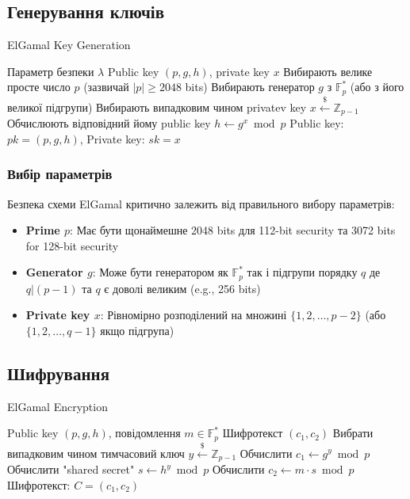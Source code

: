 \subsection{Генерування ключів}

\begin{algorithm}
    \caption{ElGamal Key Generation}
    \begin{algorithmic}[1]
        \Require Параметр безпеки $\lambda$
        \Ensure Public key $(p, g, h)$, private key $x$
        \State Вибирають велике просте число $p$ (зазвичай $|p| \geq 2048$ bits)
        \State Вибирають генератор $g$ з $\mathbb{F}_p^*$ (або з його великої підгрупи)
        \State Вибирають випадковим чином privatev key $x \xleftarrow{\$} \mathbb{Z}_{p-1}$
        \State Обчислюють відповідний йому public key $h \gets g^x \bmod p$
        \State \Return Public key: $pk = (p, g, h)$, Private key: $sk = x$
    \end{algorithmic}
\end{algorithm}

\subsubsection{Вибір параметрів}

Безпека схеми ElGamal критично залежить від правильного вибору параметрів:

\begin{itemize}
    \item \textbf{Prime $p$}: Має бути щонаймешне 2048 bits для 112-bit security та 3072 bits for 128-bit security~\cite{barker2020recommendation}
    \item \textbf{Generator $g$}: Може бути генератором як $\mathbb{F}_p^*$ так і підгрупи порядку $q$ де 
        $q \vert (p-1)$ та $q$ є доволі великим (e.g., 256 bits)
    \item \textbf{Private key $x$}: Рівномірно розподілений на множині $\{1, 2, \ldots, p-2\}$ 
        (або $\{1, 2, \ldots, q-1\}$ якщо підгрупа)
\end{itemize}

\subsection{Шифрування}

\begin{algorithm}
    \caption{ElGamal Encryption}
    \begin{algorithmic}[1]
        \Require Public key $(p, g, h)$, повідомлення $m \in \mathbb{F}_p^*$
        \Ensure Шифротекст $(c_1, c_2)$
        \State Вибрати випадковим чином тимчасовий ключ $y \xleftarrow{\$} \mathbb{Z}_{p-1}$
        \State Обчислити $c_1 \gets g^y \bmod p$
        \State Обчислити "shared secret"{} $s \gets h^y \bmod p$
        \State Обчислити $c_2 \gets m \cdot s \bmod p$
        \State \Return Шифротекст: $C = (c_1, c_2)$
    \end{algorithmic}
\end{algorithm}

